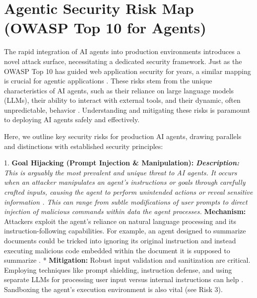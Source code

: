 \section{Agentic Security Risk Map (OWASP Top 10 for Agents)}

The rapid integration of AI agents into production environments introduces a novel attack surface, necessitating a dedicated security framework. Just as the OWASP Top 10 has guided web application security for years, a similar mapping is crucial for agentic applications \cite{OWASP2026}. These risks stem from the unique characteristics of AI agents, such as their reliance on large language models (LLMs), their ability to interact with external tools, and their dynamic, often unpredictable, behavior \cite{Reger2026}. Understanding and mitigating these risks is paramount to deploying AI agents safely and effectively.

Here, we outline key security risks for production AI agents, drawing parallels and distinctions with established security principles:

1.  \textbf{Goal Hijacking (Prompt Injection \& Manipulation):}     \textit{   \textbf{Description:} This is arguably the most prevalent and unique threat to AI agents. It occurs when an attacker manipulates an agent's instructions or goals through carefully crafted inputs, causing the agent to perform unintended actions or reveal sensitive information \cite{Reger2026}. This can range from subtle modifications of user prompts to direct injection of malicious commands within data the agent processes.     }   \textbf{Mechanism:} Attackers exploit the agent's reliance on natural language processing and its instruction-following capabilities. For example, an agent designed to summarize documents could be tricked into ignoring its original instruction and instead executing malicious code embedded within the document it is supposed to summarize \cite{OWASP2026}.     *   \textbf{Mitigation:} Robust input validation and sanitization are critical. Employing techniques like prompt shielding, instruction defense, and using separate LLMs for processing user input versus internal instructions can help \cite{Reger2026}. Sandboxing the agent's execution environment is also vital (see Risk 3).

